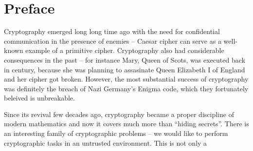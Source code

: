 \cleardoublepage{}

\chapter*{Preface}

Cryptography emerged long long time ago with the need for confidential communication in the presence of enemies -- Caesar cipher can serve as a well-known example of a primitive cipher. Cryptography also had considerable consequences in the past -- for instance Mary, Queen of Scots, was executed back in  century, because she was planning to assasinate Queen Elizabeth I of England and her cipher got broken. However, the most substantial success of cryptography was definitely the breach of Nazi Germany's Enigma code, which they fortunately beleived is unbreakable.

Since its revival few decades ago, cryptography became a proper discipline of modern mathematics and now it covers much more than ``hiding secrets''. There is an interesting family of cryptographic problems -- we would like to perform cryptographic tasks in an untrusted environment. This is not only a 



